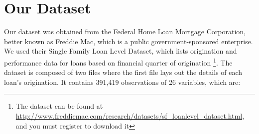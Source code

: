\documentclass[12 pt]{uncw_thesis}
\theoremstyle{plain}
\theoremstyle{remark}
\theoremstyle{definition}
\begin{document}
\section{Our Dataset}
Our dataset was obtained from the Federal Home Loan Mortgage Corporation, better known as Freddie Mac, which is a public government-sponsored enterprise. We used their Single Family Loan Level Dataset, which lists origination and performance data for loans based on financial quarter of origination \footnote{The dataset can be found at \href{ http://www.freddiemac.com/research/datasets/sf\_loanlevel\_dataset.html}{http://www.freddiemac.com/research/datasets/sf\_loanlevel\_dataset.html}, and you must register to download it}. The dataset is composed of two files where the first file lays out the details of each loan's origination. It contains 391,419 observations of 26 variables, which are: 
\end{document}
